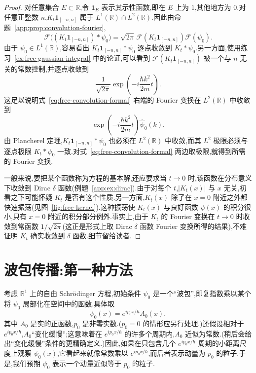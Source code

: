 \begin{proof}
对任意集合 \(E\subset\mathbb{R}\),令 \(\mathbf{1}_{E}\) 表示其示性函数,即在 \(E\) 上为 \(1\),其他地方为 \(0\).对任意正整数 \(n\),\(K_{t}\mathbf{1}_{[-n,n]}\) 属于 \(L^{1}(\mathbb{R})\cap L^{2}(\mathbb{R})\).因此由命题~\ref{app:prop:convolution-fourier},
\[
\mathcal{F}\bigl((K_{t}\mathbf{1}_{[-n,n]})*\psi_{0}\bigr)
=\sqrt{2\pi}\,\mathcal{F}(K_{t}\mathbf{1}_{[-n,n]})\mathcal{F}(\psi_{0}).
\]
由于 \(\psi_{0}\in L^{1}(\mathbb{R})\),容易看出 \(K_{t}\mathbf{1}_{[-n,n]}*\psi_{0}\) 逐点收敛到 \(K_{t}*\psi_{0}\).另一方面,使用练习~\ref{ex:free-gaussian-integral} 中的论证,可以看到 \(\mathcal{F}(K_{t}\mathbf{1}_{[-n,n]})\) 被一个与 \(n\) 无关的常数控制,并逐点收敛到
\[
\frac{1}{\sqrt{2\pi}}\exp\left(-i\frac{\hbar k^{2}}{2m}t\right).
\]
这足以说明式~\eqref{eq:free-convolution-formal} 右端的 Fourier 变换在 \(L^{2}(\mathbb{R})\) 中收敛到
\[
\exp\left(-i\frac{\hbar k^{2}}{2m}t\right)\widehat{\psi}_{0}(k).
\]
由 Plancherel 定理,\(K_{t}\mathbf{1}_{[-n,n]}*\psi_{0}\) 也必须在 \(L^{2}(\mathbb{R})\) 中收敛,而其 \(L^{2}\) 极限必须与逐点极限 \(K_{t}*\psi_{0}\) 一致.对式~\eqref{eq:free-convolution-formal} 两边取极限,就得到所需的 Fourier 变换.

一般来说,要把某个函数称为方程的基本解,还应要求当 \(t\to0\) 时,该函数在分布意义下收敛到 Dirac \(\delta\) 函数(例题~\ref{app:ex:dirac}).由于对每个 \(t\),\(|K_{t}(x)|\) 与 \(x\) 无关,初看之下可能怀疑 \(K_{t}\) 是否有这个性质.另一方面,\(K_{t}(x)\) 除了在 \(x=0\) 附近之外都快速振荡(见图~\ref{fig:free-kernel}).这种振荡使 \(K_{t}(x)\) 与良好函数 \(\psi(x)\) 的积分很小,只有 \(x=0\) 附近的积分部分例外.事实上,由于 \(K_{t}\) 的 Fourier 变换在 \(t\to0\) 时收敛到常函数 \(1/\sqrt{2\pi}\)(这正是形式上取 Dirac \(\delta\) 函数 Fourier 变换所得的结果),不难证明 \(K_{t}\) 确实收敛到 \(\delta\) 函数.细节留给读者.
\end{proof}

\section{波包传播:第一种方法}\label{sec:wave-packet-first}

考虑 \(\mathbb{R}^{1}\) 上的自由 Schrödinger 方程,初始条件 \(\psi_{0}\) 是一个“波包”,即复指数乘以某个将 \(\psi_{0}\) 局部化在空间中的函数.具体取
\begin{equation}
\psi_{0}(x)=e^{ip_{0}x/\hbar}A_{0}(x),
\label{eq:initial-wave-packet}
\end{equation}
其中 \(A_{0}\) 是实的正函数,\(p_{0}\) 是非零实数.(\(p_{0}=0\) 的情形应另行处理.)还假设相对于 \(e^{ip_{0}x/\hbar}\),\(A_{0}\)“变化缓慢”;这意味着在 \(e^{ip_{0}x/\hbar}\) 的许多个周期内,\(A_{0}\) 近似为常数.(稍后会给出“变化缓慢”条件的更精确定义.)因此,如果在只包含几个 \(e^{ip_{0}x/\hbar}\) 周期的小距离尺度上观察 \(\psi_{0}(x)\),它看起来就像常数乘以 \(e^{ip_{0}x/\hbar}\),而后者表示动量为 \(p_{0}\) 的粒子.于是,我们预期 \(\psi_{0}\) 表示一个动量近似等于 \(p_{0}\) 的粒子.

